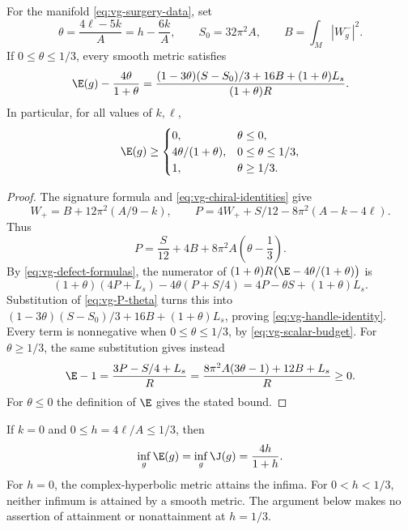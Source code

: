 \begin{proposition}\label{prop:vg-handle-identity}
For the manifold \eqref{eq:vg-surgery-data}, set
\[
 \theta=\frac{4\ell-5k}{A}=h-\frac{6k}{A},\qquad
 S_0=32\pi^2A,\qquad B=\int_M|W^-_g|^2.
\]
If $0\leq\theta\leq1/3$, every smooth metric satisfies
\begin{equation}\label{eq:vg-handle-identity}
 \E(g)-\frac{4\theta}{1+\theta}
 =\frac{(1-3\theta)(S-S_0)/3+16B+(1+\theta)L_s}
                   {(1+\theta)R}.
\end{equation}
In particular, for all values of $k,\ell$,
\begin{equation}\label{eq:vg-piecewise-bound}
 \E(g)\geq
 \begin{cases}
 0,&\theta\leq0,\\
 4\theta/(1+\theta),&0\leq\theta\leq1/3,\\
 1,&\theta\geq1/3.
 \end{cases}
\end{equation}
\end{proposition}

\begin{proof}
The signature formula and \eqref{eq:vg-chiral-identities} give
\[
 W_+=B+12\pi^2(A/9-k),\qquad
 P=4W_++S/12-8\pi^2(A-k-4\ell).
\]
Thus
\begin{equation}\label{eq:vg-P-theta}
 P=\frac S{12}+4B+8\pi^2A\left(\theta-\frac13\right).
\end{equation}
By \eqref{eq:vg-defect-formulas}, the numerator of
$(1+\theta)R\bigl(\E-4\theta/(1+\theta)\bigr)$ is
\[
 (1+\theta)(4P+L_s)-4\theta(P+S/4)
 =4P-\theta S+(1+\theta)L_s.
\]
Substitution of \eqref{eq:vg-P-theta} turns this into
$(1-3\theta)(S-S_0)/3+16B+(1+\theta)L_s$, proving
\eqref{eq:vg-handle-identity}.  Every term is nonnegative when
$0\leq\theta\leq1/3$, by \eqref{eq:vg-scalar-budget}.  For
$\theta\geq1/3$, the same substitution gives instead
\[
 \E-1=\frac{3P-S/4+L_s}{R}
       =\frac{8\pi^2A(3\theta-1)+12B+L_s}{R}\geq0.
\]
For $\theta\leq0$ the definition of $\E$ gives the stated bound.
\end{proof}

\begin{theorem}\label{thm:vg-handle-sharp}
If $k=0$ and $0\leq h=4\ell/A\leq1/3$, then
\begin{equation}\label{eq:vg-handle-sharp}
 \inf_g\E(g)=\inf_g\J(g)=\frac{4h}{1+h}.
\end{equation}
For $h=0$, the complex-hyperbolic metric attains the infima.
For $0<h<1/3$, neither infimum is attained by a smooth metric.
The argument below makes no assertion of attainment or nonattainment
at $h=1/3$.
\end{theorem}

